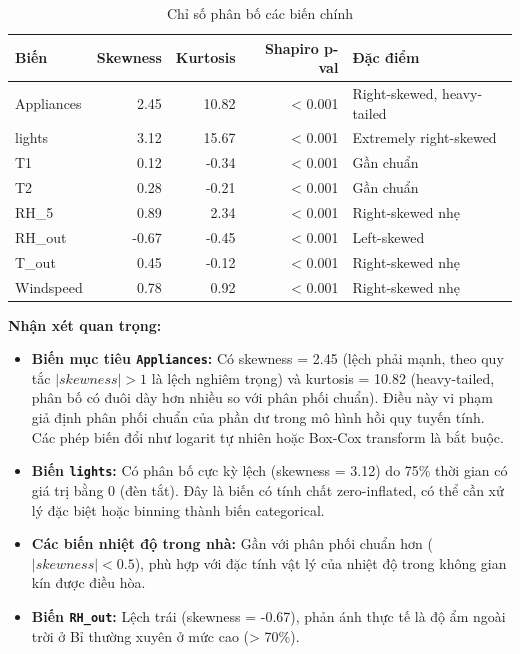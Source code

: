 \begin{table}[H]
\centering
\caption{Chỉ số phân bố các biến chính}
\label{tab:distribution_stats}
\footnotesize
\begin{tabular}{lrrrp{3cm}}
\hline
\textbf{Biến} & \textbf{Skewness} & \textbf{Kurtosis} & \textbf{Shapiro p-val} & \textbf{Đặc điểm} \\
\hline
Appliances & 2.45 & 10.82 & < 0.001 & Right-skewed, heavy-tailed \\
lights & 3.12 & 15.67 & < 0.001 & Extremely right-skewed \\
T1 & 0.12 & -0.34 & < 0.001 & Gần chuẩn \\
T2 & 0.28 & -0.21 & < 0.001 & Gần chuẩn \\
RH\_5 & 0.89 & 2.34 & < 0.001 & Right-skewed nhẹ \\
RH\_out & -0.67 & -0.45 & < 0.001 & Left-skewed \\
T\_out & 0.45 & -0.12 & < 0.001 & Right-skewed nhẹ \\
Windspeed & 0.78 & 0.92 & < 0.001 & Right-skewed nhẹ \\
\hline
\end{tabular}
\end{table}

\textbf{Nhận xét quan trọng:}

\begin{itemize} [labelsep=10pt, leftmargin=2cm]
    \item \textbf{Biến mục tiêu \texttt{Appliances}:} Có skewness = 2.45 (lệch phải mạnh, theo quy tắc $|skewness| > 1$ là lệch nghiêm trọng) và kurtosis = 10.82 (heavy-tailed, phân bố có đuôi dày hơn nhiều so với phân phối chuẩn). Điều này vi phạm giả định phân phối chuẩn của phần dư trong mô hình hồi quy tuyến tính. Các phép biến đổi như logarit tự nhiên hoặc Box-Cox transform là bắt buộc.
    
    \item \textbf{Biến \texttt{lights}:} Có phân bố cực kỳ lệch (skewness = 3.12) do 75\% thời gian có giá trị bằng 0 (đèn tắt). Đây là biến có tính chất zero-inflated, có thể cần xử lý đặc biệt hoặc binning thành biến categorical.
    
    \item \textbf{Các biến nhiệt độ trong nhà:} Gần với phân phối chuẩn hơn ($|skewness| < 0.5$), phù hợp với đặc tính vật lý của nhiệt độ trong không gian kín được điều hòa.
    
    \item \textbf{Biến \texttt{RH\_out}:} Lệch trái (skewness = -0.67), phản ánh thực tế là độ ẩm ngoài trời ở Bỉ thường xuyên ở mức cao (> 70\%).
\end{itemize}

